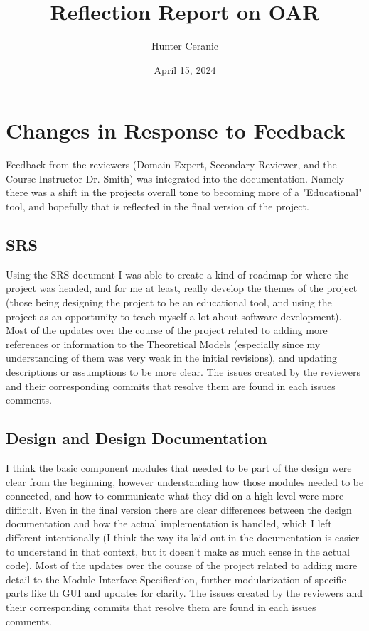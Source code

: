 \documentclass{article}
\title{Reflection Report on OAR}
\author{Hunter Ceranic}
\date{April 15, 2024}
\begin{document}
\maketitle

\section{Changes in Response to Feedback}

Feedback from the reviewers (Domain Expert, Secondary Reviewer, and the Course Instructor Dr. Smith) was integrated
into the documentation. Namely there was a shift in the projects overall tone to becoming more of a "Educational" tool,
and hopefully that is reflected in the final version of the project.

\subsection{SRS}

Using the SRS document I was able to create a kind of roadmap for where the project was headed, and for me at least, really develop the
themes of the project (those being designing the project to be an educational tool, and using the project as an opportunity to 
teach myself a lot about software development).
Most of the updates over the course of the project related to adding more
references or information to the Theoretical Models (especially since my understanding of them was very weak in the initial revisions),
and updating descriptions or assumptions to be
more clear. The issues created by the reviewers and their corresponding commits that resolve them are found in each issues comments.


\subsection{Design and Design Documentation}

I think the basic component modules that needed to be part of the design were clear from the beginning,
however understanding how those modules needed to be connected, and how to communicate what they did
on a high-level were more difficult. Even in the final version there are clear differences between the design documentation and
how the actual implementation is handled, which I left different intentionally (I think the way its laid out in the documentation
is easier to understand in that context, but it doesn't make as much sense in the actual code). Most of the updates over the course of the project related to adding more
detail to the Module Interface Specification, further modularization of specific parts like th GUI
and updates for clarity. The issues created by the reviewers and their corresponding commits that resolve them are found in each issues comments.
\end{document}
